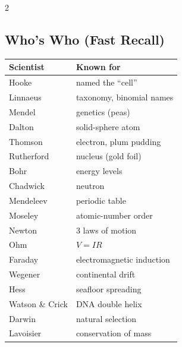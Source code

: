 \begin{multicols}{2}
\subsection*{Who's Who (Fast Recall)}
\begin{tabular}{@{}p{2.4cm}p{5.2cm}@{}}
\toprule
Scientist & Known for\\ \midrule
Hooke & named the ``cell''\\
Linnaeus & taxonomy, binomial names\\
Mendel & genetics (peas)\\
Dalton & solid-sphere atom\\
Thomson & electron, plum pudding\\
Rutherford & nucleus (gold foil)\\
Bohr & energy levels\\
Chadwick & neutron\\
Mendeleev & periodic table\\
Moseley & atomic-number order\\
Newton & 3 laws of motion\\
Ohm & $V = IR$\\
Faraday & electromagnetic induction\\
Wegener & continental drift\\
Hess & seafloor spreading\\
Watson \& Crick & DNA double helix\\
Darwin & natural selection\\
Lavoisier & conservation of mass\\ \bottomrule
\end{tabular}

\end{multicols}
